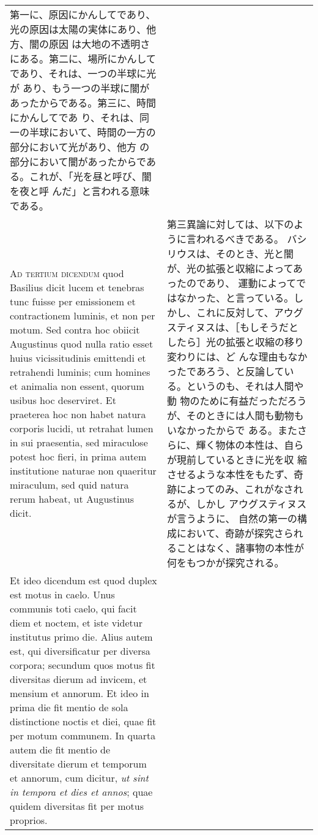 \documentclass[10pt]{jsarticle} %
\begin{document}
\begin{longtable}{p{21em}p{21em}}
第一に、原因にかんしてであり、光の原因は太陽の実体にあり、他方、闇の原因
 は大地の不透明さにある。第二に、場所にかんしてであり、それは、一つの半球に光が
 あり、もう一つの半球に闇があったからである。第三に、時間にかんしてであ
 り、それは、同一の半球において、時間の一方の部分において光があり、他方
 の部分において闇があったからである。これが、「光を昼と呼び、闇を夜と呼
 んだ」と言われる意味である。


\\


{\scshape Ad tertium dicendum} quod Basilius dicit lucem
et tenebras tunc fuisse per emissionem et contractionem luminis, et non
per motum. Sed contra hoc obiicit Augustinus quod nulla ratio esset
huius vicissitudinis emittendi et retrahendi luminis; cum homines et
animalia non essent, quorum usibus hoc deserviret. Et praeterea hoc non
habet natura corporis lucidi, ut retrahat lumen in sui praesentia, sed
miraculose potest hoc fieri, in prima autem institutione naturae non
quaeritur miraculum, sed quid natura rerum habeat, ut Augustinus
dicit. 



&


第三異論に対しては、以下のように言われるべきである。
バシリウスは、そのとき、光と闇が、光の拡張と収縮によってあったのであり、
 運動によってではなかった、と言っている。しかし、これに反対して、アウグ
 スティヌスは、［もしそうだとしたら］光の拡張と収縮の移り変わりには、ど
 んな理由もなかったであろう、と反論している。というのも、それは人間や動
 物のために有益だっただろうが、そのときには人間も動物もいなかったからで
 ある。またさらに、輝く物体の本性は、自らが現前しているときに光を収
 縮させるような本性をもたず、奇跡によってのみ、これがなされるが、しかし
アウグスティヌスが言うように、 自然の第一の構成において、奇跡が探究さられることはなく、諸事物の本性が何をもつかが探究される。

\\



Et ideo dicendum est quod duplex est motus in caelo. Unus
communis toti caelo, qui facit diem et noctem, et iste videtur
institutus primo die. Alius autem est, qui diversificatur per diversa
corpora; secundum quos motus fit diversitas dierum ad invicem, et
mensium et annorum. Et ideo in prima die fit mentio de sola distinctione
noctis et diei, quae fit per motum communem. In quarta autem die fit
mentio de diversitate dierum et temporum et annorum, cum dicitur, {\itshape ut
sint in tempora et dies et annos}; quae quidem diversitas fit per motus
proprios.


\end{longtable}
\end{document}
